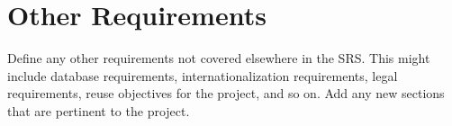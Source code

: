 \chapter{Other Requirements}

Define any other requirements not covered elsewhere in the SRS. This
might include database requirements, internationalization
requirements, legal requirements, reuse objectives for the project,
and so on. Add any new sections that are pertinent to the project.
